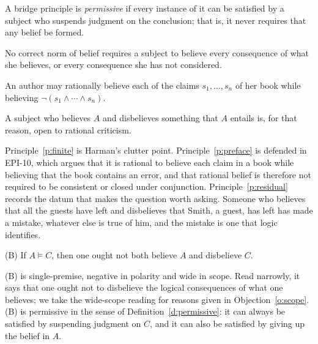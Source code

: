 \documentclass{situationist-preprint}
\begin{document}
\begin{definition}[Permissive]\label{d:permissive}
A bridge principle is \emph{permissive} if every instance of it can be satisfied by a subject who suspends judgment on the conclusion; that is, it never requires that any belief be formed.
\end{definition}

\begin{principle}[Finitude]\label{p:finite}
No correct norm of belief requires a subject to believe every consequence of what she believes, or every consequence she has not considered.
\end{principle}

\begin{principle}[Preface]\label{p:preface}
An author may rationally believe each of the claims $s_1, \ldots, s_n$ of her book while believing $\neg(s_1 \wedge \cdots \wedge s_n)$.
\end{principle}

\begin{principle}\label{p:residual}
A subject who believes $A$ and disbelieves something that $A$ entails is, for that reason, open to rational criticism.
\end{principle}

Principle~\ref{p:finite} is Harman's clutter point. Principle~\ref{p:preface} is defended in EPI-10, which argues that it is rational to believe each claim in a book while believing that the book contains an error, and that rational belief is therefore not required to be consistent or closed under conjunction. Principle~\ref{p:residual} records the datum that makes the question worth asking. Someone who believes that all the guests have left and disbelieves that Smith, a guest, has left has made a mistake, whatever else is true of him, and the mistake is one that logic identifies.

\begin{definition}\label{d:B}
(B) If $A \models C$, then one ought not both believe $A$ and disbelieve $C$.
\end{definition}

(B) is single-premise, negative in polarity and wide in scope. Read narrowly, it says that one ought not to disbelieve the logical consequences of what one believes; we take the wide-scope reading for reasons given in Objection~\ref{o:scope}. (B) is permissive in the sense of Definition~\ref{d:permissive}: it can always be satisfied by suspending judgment on $C$, and it can also be satisfied by giving up the belief in $A$.
\end{document}
